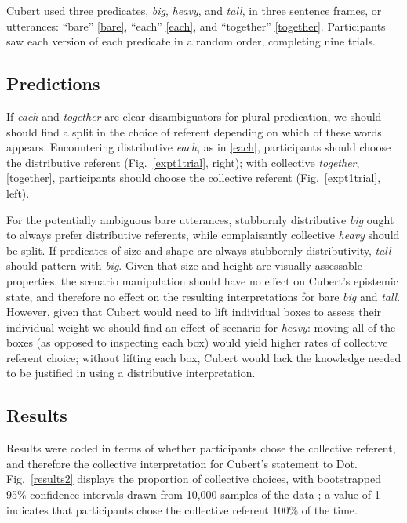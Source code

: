 \documentclass[linguex]{sp}
\begin{document}
 Cubert used three predicates, \emph{big}, \emph{heavy}, and \emph{tall}, in three sentence frames, or utterances: ``bare'' \ref{bare}, ``each'' \ref{each}, and ``together'' \ref{together}. Participants saw each version of each predicate in a random order, completing nine trials. 

\subsection{Predictions}

If \emph{each} and \emph{together} are clear disambiguators for plural predication, we should should find a split in the choice of referent depending on which of these words appears. Encountering distributive \emph{each}, as in \ref{each}, participants should choose the distributive referent (Fig.~\ref{expt1trial}, right); with collective \emph{together}, \ref{together}, participants should choose the collective referent (Fig.~\ref{expt1trial}, left). 

For the potentially ambiguous bare utterances, stubbornly distributive \emph{big} ought to always prefer distributive referents, while complaisantly collective \emph{heavy} should be split. If predicates of size and shape are always stubbornly distributivity, \emph{tall} should pattern with \emph{big}. Given that size and height are visually assessable properties, the scenario manipulation should have no effect on Cubert's epistemic state, and therefore no effect on the resulting interpretations for bare \emph{big} and \emph{tall}. 
However, given that Cubert would need to lift individual boxes to assess their individual weight we should find an effect of scenario for \emph{heavy}: moving all of the boxes (as opposed to inspecting each box) would yield higher rates of collective referent choice; without lifting each box, Cubert would lack the knowledge needed to be justified in using a distributive interpretation.

\subsection{Results}

Results were coded in terms of whether participants chose the collective referent, and therefore the collective interpretation for Cubert's statement to Dot. Fig.\ \ref{results2} displays the proportion of collective choices, with bootstrapped 95\% confidence intervals drawn from 10,000 samples of the data \citep{diciccioefron1996}; a value of 1 indicates that participants chose the collective referent 100\% of the time.
\end{document}
